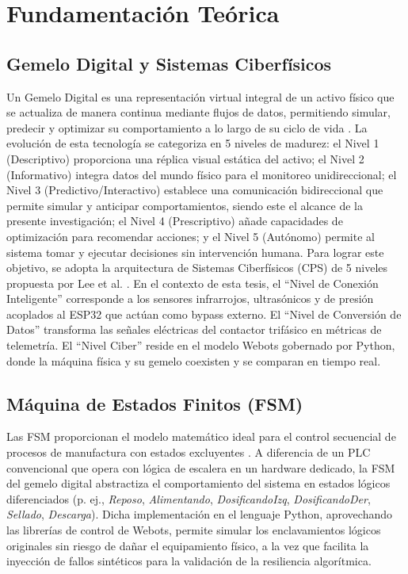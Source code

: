 \section{Fundamentación Teórica}
\subsection*{Gemelo Digital y Sistemas Ciberfísicos}
Un Gemelo Digital es una representación virtual integral de un activo físico que se actualiza de manera continua mediante flujos de datos, permitiendo simular, predecir y optimizar su comportamiento a lo largo de su ciclo de vida \cite{tao2019}. La evolución de esta tecnología se categoriza en 5 niveles de madurez: el Nivel 1 (Descriptivo) proporciona una réplica visual estática del activo; el Nivel 2 (Informativo) integra datos del mundo físico para el monitoreo unidireccional; el Nivel 3 (Predictivo/Interactivo) establece una comunicación bidireccional que permite simular y anticipar comportamientos, siendo este el alcance de la presente investigación; el Nivel 4 (Prescriptivo) añade capacidades de optimización para recomendar acciones; y el Nivel 5 (Autónomo) permite al sistema tomar y ejecutar decisiones sin intervención humana. Para lograr este objetivo, se adopta la arquitectura de Sistemas Ciberfísicos (CPS) de 5 niveles propuesta por Lee et al. \cite{lee2015}. En el contexto de esta tesis, el ``Nivel de Conexión Inteligente'' corresponde a los sensores infrarrojos, ultrasónicos y de presión acoplados al ESP32 que actúan como bypass externo. El ``Nivel de Conversión de Datos'' transforma las señales eléctricas del contactor trifásico en métricas de telemetría. El ``Nivel Ciber'' reside en el modelo Webots gobernado por Python, donde la máquina física y su gemelo coexisten y se comparan en tiempo real.

\subsection*{Máquina de Estados Finitos (FSM)}
Las FSM proporcionan el modelo matemático ideal para el control secuencial de procesos de manufactura con estados excluyentes \cite{cassandras2021}. A diferencia de un PLC convencional que opera con lógica de escalera en un hardware dedicado, la FSM del gemelo digital abstractiza el comportamiento del sistema en estados lógicos diferenciados (p. ej., \textit{Reposo}, \textit{Alimentando}, \textit{DosificandoIzq}, \textit{DosificandoDer}, \textit{Sellado}, \textit{Descarga}). Dicha implementación en el lenguaje Python, aprovechando las librerías de control de Webots, permite simular los enclavamientos lógicos originales sin riesgo de dañar el equipamiento físico, a la vez que facilita la inyección de fallos sintéticos para la validación de la resiliencia algorítmica.


